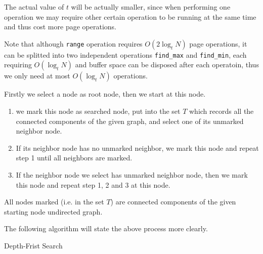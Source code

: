 \begin{questions}
\begin{parts}
        The actual value of $t$ will be actually smaller, since when performing one operation we may require other certain operation to be running at the same time and thus cost more page operations.

        Note that although \texttt{range} operation requires $O(2\log_t N)$ page operations, it can be splitted into two independent operations \texttt{find\_max} and \texttt{find\_min}, each requiring $O(\log_t N)$ and buffer space can be disposed after each operatoin, thus we only need at most $O(\log_t N)$ operations.
    \end{parts}


    Firstly we select a node as root node, then we start at this node.
    \begin{enumerate}
        \item we mark this node as searched node, put into the set $T$ which records all the connected components of the given graph, and select one of its unmarked neighbor node.
        \item If its neighbor node has no unmarked neighbor, we mark this node and repeat step 1 until all neighbors are marked.
        \item If the neighbor node we select has unmarked neighbor node, then we mark this node and repeat step 1, 2 and 3 at this node.
    \end{enumerate}

    All nodes marked (i.e. in the set $T$) are connected components of the given starting node undirected graph.

    The following algorithm will state the above process more clearly.

    \begin{algorithm}
        \caption{Depth-Frist Search}
        \label{algo-dfs}



\end{algorithm}
\end{questions}
